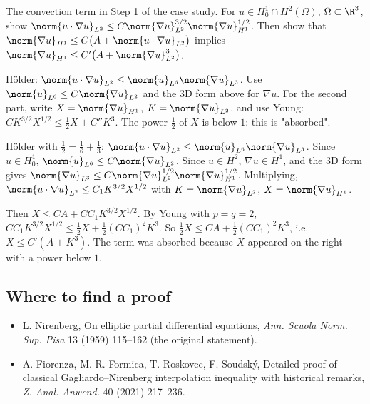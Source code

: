\begin{exercise}
  The convection term in Step 1 of the case study. For $u \in H^1_0 \cap H^2(\Omega)$, $\Omega \subset \R^3$, show $\norm{u\cdot\nabla u}_{L^2} \le C\norm{\nabla u}_{L^2}^{3/2}\norm{\nabla u}_{H^1}^{1/2}$. Then show that $\norm{\nabla u}_{H^1} \le C\big(A + \norm{u\cdot\nabla u}_{L^2}\big)$ implies $\norm{\nabla u}_{H^1} \le C'\big(A + \norm{\nabla u}_{L^2}^3\big)$.
  \begin{hint}
    Hölder: $\norm{u\cdot\nabla u}_{L^2} \le \norm{u}_{L^6}\norm{\nabla u}_{L^3}$. Use $\norm{u}_{L^6} \le C\norm{\nabla u}_{L^2}$ and the 3D form above for $\nabla u$. For the second part, write $X = \norm{\nabla u}_{H^1}$, $K = \norm{\nabla u}_{L^2}$, and use Young: $CK^{3/2}X^{1/2} \le \frac12 X + C''K^3$. The power $\frac12$ of $X$ is below $1$: this is "absorbed".
  \end{hint}
  \begin{solution}
    Hölder with $\frac12 = \frac16 + \frac13$: $\norm{u\cdot\nabla u}_{L^2} \le \norm{u}_{L^6}\norm{\nabla u}_{L^3}$. Since $u \in H^1_0$, $\norm{u}_{L^6} \le C\norm{\nabla u}_{L^2}$. Since $u \in H^2$, $\nabla u \in H^1$, and the 3D form gives $\norm{\nabla u}_{L^3} \le C\norm{\nabla u}_{L^2}^{1/2}\norm{\nabla u}_{H^1}^{1/2}$. Multiplying, $\norm{u\cdot\nabla u}_{L^2} \le C_1K^{3/2}X^{1/2}$ with $K = \norm{\nabla u}_{L^2}$, $X = \norm{\nabla u}_{H^1}$.

    Then $X \le CA + CC_1K^{3/2}X^{1/2}$. By Young with $p = q = 2$, $CC_1K^{3/2}X^{1/2} \le \frac12X + \frac12(CC_1)^2K^3$. So $\frac12X \le CA + \frac12(CC_1)^2K^3$, i.e. $X \le C'(A + K^3)$. The term was absorbed because $X$ appeared on the right with a power below $1$.
  \end{solution}
\end{exercise}

\subsection*{Where to find a proof}

\begin{itemize}
\item L. Nirenberg, On elliptic partial differential equations, \emph{Ann. Scuola Norm. Sup. Pisa} 13 (1959) 115--162 (the original statement).
\item A. Fiorenza, M. R. Formica, T. Roskovec, F. Soudský, Detailed proof of classical Gagliardo--Nirenberg interpolation inequality with historical remarks, \emph{Z. Anal. Anwend.} 40 (2021) 217--236.
\end{itemize}
